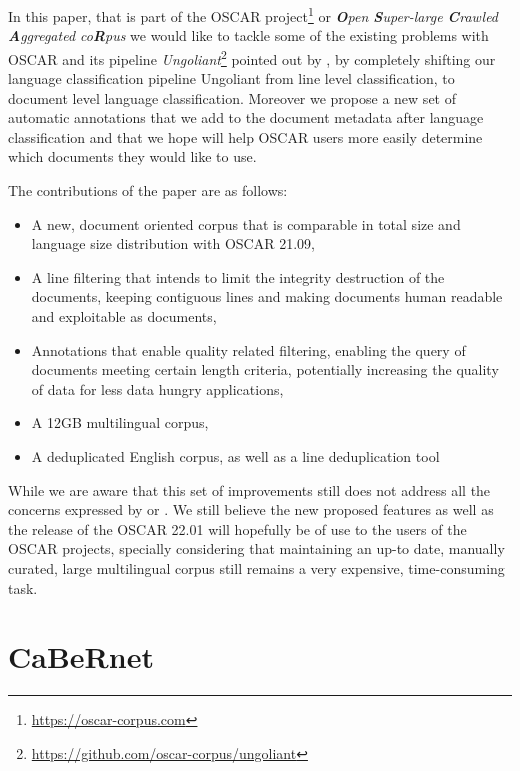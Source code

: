 In this paper, that is part of the OSCAR project\footnote{\url{https://oscar-corpus.com}} or \emph{\textbf{O}pen \textbf{S}uper-large \textbf{C}rawled \textbf{A}ggregated co\textbf{R}pus} \cite{ortiz-suarez-etal-2019-asynchronous,ortiz-suarez-etal-2020-monolingual,abadji-etal-2021-ungoliant} we would like to tackle some of the existing problems with OSCAR and its pipeline \emph{Ungoliant}\footnote{\url{https://github.com/oscar-corpus/ungoliant}} pointed out by , by completely shifting our language classification pipeline Ungoliant from line level classification, to document level language classification. Moreover we propose a new set of automatic annotations that we add to the document metadata after language classification and that we hope will help OSCAR users more easily determine which documents they would like to use.

The contributions of the paper are as follows:

\begin{itemize}
    \item A new, document oriented corpus that is comparable in total size and language size distribution with OSCAR 21.09,
    \item A line filtering that intends to limit the integrity destruction of the documents, keeping contiguous lines and making documents human readable and exploitable as documents,
    \item Annotations that enable quality related filtering, enabling the query of documents meeting certain length criteria, potentially increasing the quality of data for less data hungry applications,
    \item A 12GB multilingual corpus,
    \item A deduplicated English corpus, as well as a line deduplication tool
\end{itemize}

While we are aware that this set of improvements still does not address all the concerns expressed by  or . We still believe the new proposed features as well as the release of the OSCAR 22.01 will hopefully be of use to the users of the OSCAR projects, specially considering that maintaining an up-to date, manually curated, large multilingual corpus still remains a very expensive, time-consuming task.

\section{CaBeRnet}


